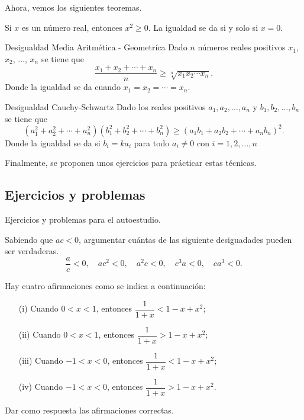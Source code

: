 Ahora, vemos los siguientes teoremas.

\begin{theorem.tcb}{}{}
    Si $x$ es un número real, entonces $x^2 \geq 0$.
    La igualdad se da si y solo si $x = 0$.
\end{theorem.tcb}

\begin{theorem.tcb}{Desigualdad Media Aritmética - Geometríca}{}
    Dado $n$ números reales positivos $x_1$, $x_2$, $\ldots$, $x_n$ se tiene que
    \[
        \dfrac{x_1 + x_2 + \cdots + x_n}{n} \geq \sqrt[n]{x_1 x_2 \cdots x_n}.
    \]
    Donde la igualdad se da cuando $x_1 = x_2 = \cdots = x_n$.
\end{theorem.tcb}

\begin{theorem.tcb}{Desigualdad Cauchy-Schwartz}{}
    Dado los reales positivos $a_1, a_2, \ldots, a_n$ y $b_1, b_2, \ldots, b_n$ se tiene que
    \[
        (a_1^2 + a_2^2 + \cdots + a_n^2)(b_1^2 + b_2^2 + \cdots + b_n^2) \geq (a_1 b_1 + a_2 b_2 + \cdots + a_n b_n)^2.
    \]
    Donde la igualdad se da si $b_i = k a_i$ para todo $a_i \neq 0$ con $i = 1, 2, \ldots, n$
\end{theorem.tcb}

Finalmente, se proponen unos ejercicios para prácticar estas técnicas.



\subsection{Ejercicios y problemas}

Ejercicios y problemas para el autoestudio.

\begin{exercise}
    Sabiendo que $ac < 0$, argumentar cuántas de las siguiente desiguadades pueden ser verdaderas.
    \[
        \frac{a}{c} < 0,\quad ac^2 < 0,\quad a^2 c < 0,\quad c^3 a < 0,\quad ca^3 < 0.
    \]
\end{exercise}

\begin{exercise}
    Hay cuatro afirmaciones como se indica a continuación:
    \begin{itemize}
        \item[(i)] Cuando $0 < x < 1$, entonces $\dfrac{1}{1 + x} < 1 - x + x^2$;
        \item[(ii)] Cuando $0 < x < 1$, entonces $\dfrac{1}{1 + x} > 1 - x + x^2$;
        \item[(iii)] Cuando $-1 < x < 0$, entonces $\dfrac{1}{1 + x} < 1 - x + x^2$;
        \item[(iv)] Cuando $-1 < x < 0$, entonces $\dfrac{1}{1 + x} > 1 - x + x^2$.
    \end{itemize}
    Dar como respuesta las afirmaciones correctas.
\end{exercise}

